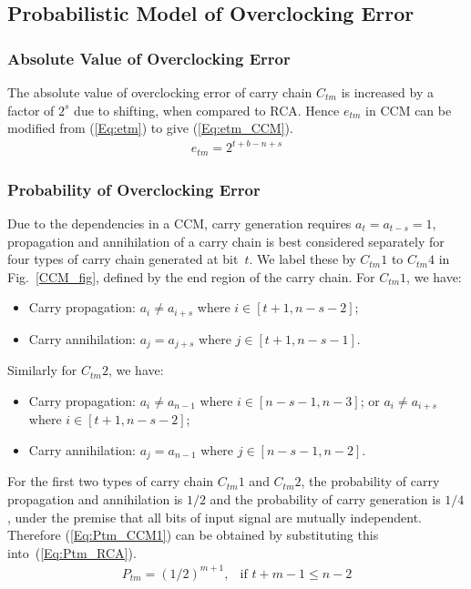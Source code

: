 \documentclass[prodmode,acmtrets]{acmsmall} %
\begin{document}
\subsection{Probabilistic Model of Overclocking Error}
\subsubsection{Absolute Value of Overclocking Error}
The absolute value of overclocking error of carry chain $C_{tm}$ is increased by a factor of $2^s$ due to shifting, when compared to RCA. Hence $e_{tm}$ in CCM can be modified from (\ref{Eq:etm}) to give (\ref{Eq:etm_CCM}).
%
\begin{eqnarray}\label{Eq:etm_CCM}
  e_{tm}=2^{t+b-n+s}
\end{eqnarray}

\subsubsection{Probability of Overclocking Error}
Due to the dependencies in a CCM, carry generation requires $a_t=a_{t-s}=1$, propagation and annihilation of a carry chain is best considered separately for four types of carry chain generated at bit~$t$. We label these by $C_{tm}1$ to $C_{tm}4$ in Fig.~\ref{CCM_fig}, defined by the end region of the carry chain. For $C_{tm}1$, we have:

\begin{itemize}
  \item Carry propagation: $a_i\neq a_{i+s}$ where $i\in[t+1,n-s-2]$;
  \item Carry annihilation: $a_j=a_{j+s}$ where $j\in[t+1,n-s-1]$.
\end{itemize}

Similarly for $C_{tm}2$, we have:

\begin{itemize}
  \item Carry propagation: $a_i\neq a_{n-1}$ where $i\in[n-s-1,n-3]$; or $a_i\neq a_{i+s}$ where $i\in[t+1,n-s-2]$;
  \item Carry annihilation: $a_j=a_{n-1}$ where $j\in[n-s-1,n-2]$.
\end{itemize}

For the first two types of carry chain $C_{tm}1$ and $C_{tm}2$, the probability of carry propagation and annihilation is $1/2$ and the probability of carry generation is $1/4$, under the premise that all bits of input signal are mutually independent. Therefore (\ref{Eq:Ptm_CCM1}) can be obtained by substituting this into~(\ref{Eq:Ptm_RCA}).
%
\begin{eqnarray}\label{Eq:Ptm_CCM1}
  P_{tm}=\left(1/2\right)^{m+1}, & \textrm{if $t+m-1\leqslant n-2$}
\end{eqnarray}
\end{document}
